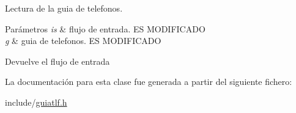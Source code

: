 Lectura de la guia de telefonos. 


\begin{DoxyParams}{Parámetros}
{\em is} & flujo de entrada. ES M\+O\+D\+I\+F\+I\+C\+A\+DO \\
\hline
{\em g} & guia de telefonos. ES M\+O\+D\+I\+F\+I\+C\+A\+DO \\
\hline
\end{DoxyParams}
\begin{DoxyReturn}{Devuelve}
el flujo de entrada 
\end{DoxyReturn}


La documentación para esta clase fue generada a partir del siguiente fichero\+:\begin{DoxyCompactItemize}
\item 
include/\hyperlink{guiatlf_8h}{guiatlf.\+h}\end{DoxyCompactItemize}
